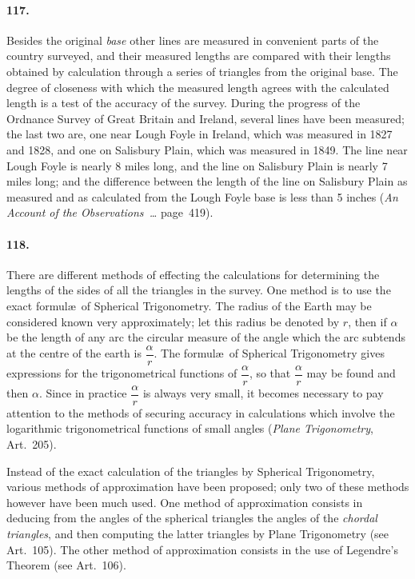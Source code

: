 \documentclass{book}[2004/02/16]
\begin{document}
\begin{mainmatter}
\begin{spacing}{1.3}
\paragraph{117.} Besides the original \textit{base} other lines are measured in
convenient parts of the country surveyed, and their measured lengths
are compared with their lengths obtained by calculation through a
series of triangles from the original base. The degree of closeness
with which the measured length agrees with the calculated
length is a test of the accuracy of the survey. During the progress
of the Ordnance Survey of Great Britain and Ireland, several
lines have been measured; the last two are, one near Lough
Foyle in Ireland, which was measured in 1827 and 1828, and one
on Salisbury Plain, which was measured in 1849. The line near
Lough Foyle is nearly 8 miles long, and the line on Salisbury
Plain is nearly 7 miles long; and the difference between the length
of the line on Salisbury Plain as measured and as calculated from
the Lough Foyle base is less than 5 inches (\textit{An Account of the
Observations~\ldots} page~419).

\paragraph{118.} There are different methods of effecting the calculations
for determining the lengths of the sides of all the triangles in the
survey. One method is to use the exact formul\ae\ of Spherical
Trigonometry. The radius of the Earth may be considered known
very approximately; let this radius be denoted by $r$, then if $\alpha$ be
the length of any arc the circular measure of the angle which the
arc subtends at the centre of the earth is $\dfrac{\alpha}{r}$. The formul\ae\ of
Spherical Trigonometry gives expressions for the trigonometrical
functions of $\dfrac{\alpha}{r}$, so that $\dfrac{\alpha}{r}$ may be found and then $\alpha$. Since in
practice $\dfrac{\alpha}{r}$ is always very small, it becomes necessary to pay
attention to the methods of securing accuracy in calculations
which involve the logarithmic trigonometrical functions of small
angles (\textit{Plane Trigonometry}, Art.~205).

Instead of the exact calculation of the triangles by Spherical
Trigonometry, various methods of approximation have been proposed;
only two of these methods however have been much used.
One method of approximation consists in deducing from the angles
of the spherical triangles the angles of the \textit{chordal triangles}, and
then computing the latter triangles by Plane Trigonometry (see
Art.\ 105). The other method of approximation consists in the
use of Legendre's Theorem (see Art.~106).


\end{spacing}
\end{mainmatter}
\end{document}
